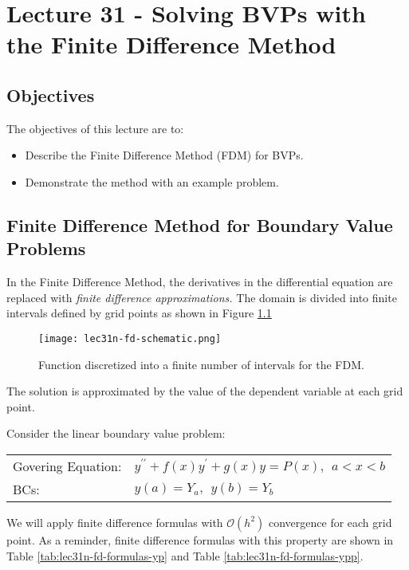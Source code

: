 \chapter{Lecture 31 - Solving BVPs with the Finite Difference Method}
\label{ch:lec31n}
\section{Objectives}
The objectives of this lecture are to:
\begin{itemize}
\item Describe the Finite Difference Method (FDM) for BVPs.
\item Demonstrate the method with an example problem.
\end{itemize}
\setcounter{lstannotation}{0}

\section{Finite Difference Method for Boundary Value Problems}

In the Finite Difference Method, the derivatives in the differential equation are replaced with \emph{finite difference approximations.}  The domain is divided into finite intervals defined by grid points as shown in Figure \ref{fig:lec31-fd-schematic}
\begin{figure}[h!]
\texttt{[image: lec31n-fd-schematic.png]}
\caption{Function discretized into a finite number of intervals for the FDM.}
\label{fig:lec31-fd-schematic}
\end{figure}
The solution is approximated by the value of the dependent variable at each grid point.  

\vspace{1.0cm}

\noindent Consider the linear boundary value problem:

\begin{table}
\begin{tabular}{l l}
Govering Equation: & $y^{\prime \prime} + f(x)y^{\prime} + g(x)y = P(x), \ \ a < x < b$ \\
BCs: & $y(a) = Y_a, \ \ y(b) = Y_b$ \\
\end{tabular}
\end{table}

\vspace{0.25cm}

\noindent We will apply finite difference formulas with $\mathcal{O}(h^2)$ convergence for each grid point.  As a reminder, finite difference formulas with this property are shown in Table \ref{tab:lec31n-fd-formulas-yp} and Table \ref{tab:lec31n-fd-formulas-ypp}.

